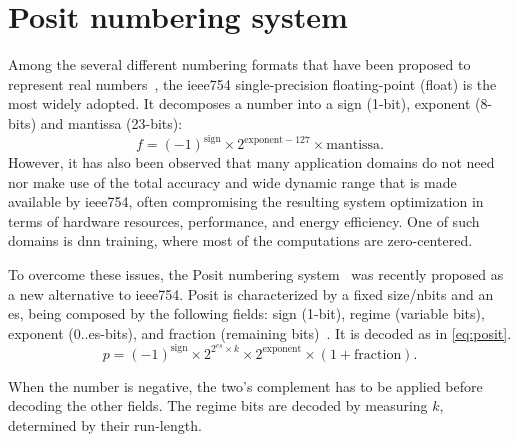 \documentclass{article}
\begin{document}
	\section{Posit numbering system}
	
	Among the several different numbering formats that have been proposed to represent real numbers~\cite{Sousa2020}, the \gls{ieee754} single-precision floating-point (float) is the most widely adopted. It decomposes a number into a sign (1-bit), exponent (8-bits) and mantissa (23-bits):
	\begin{equation}
	f = \left(-1\right)^\text{sign} \times \text{2}^{\text{exponent}-127} \times \text{mantissa}.
	\label{eq:float}
	\end{equation}
	However, it has also been observed that many application domains do not need nor make use of the total accuracy and wide dynamic range that is made available by \gls{ieee754}, often compromising the resulting system optimization in terms of hardware resources, performance, and energy efficiency. One of such domains is \gls{dnn} training, where most of the computations are zero-centered.
	
	To overcome these issues, the Posit numbering system~\cite{Gustafson2017} was recently proposed as a new alternative to \gls{ieee754}. Posit is characterized by a fixed size/\gls{nbits} and an \gls{es}, being composed by the following fields: sign (1-bit), regime (variable bits), exponent (0..\gls{es}-bits), and fraction (remaining bits)~\cite{Group2018}. It is decoded as in \cref{eq:posit}.
	\begin{equation}
	p = \left(-1\right)^\text{sign} \times 2^{2^\textit{es} \times k} \times 2^\text{exponent} \times \left( 1 + \text{fraction} \right).
	\label{eq:posit}
	\end{equation}
	
	When the number is negative, the two's complement has to be applied before decoding the other fields. The regime bits are decoded by measuring $k$, determined by their run-length.
	
	
\end{document}
